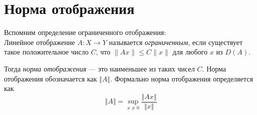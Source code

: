 \section{Норма отображения}
\label{sec:q-10}
Вспомним определение ограниченного отображения:\\
Линейное отображение $A:X\to Y$ называется \textit{ограниченным}, если существует такое положительное число $C$, что $\|Ax\| \le C\|x\|$ для любого $x$ из $D(A)$.

Тогда \textit{норма отображения} --- это наименьшее из таких чисел $C$. Норма отображения обозначается как $\Vert A \Vert$. Формально норма отображения определяется как
$$\Vert A \Vert = \sup_{x\neq 0}\frac{\Vert Ax \Vert}{\Vert x \Vert}$$

